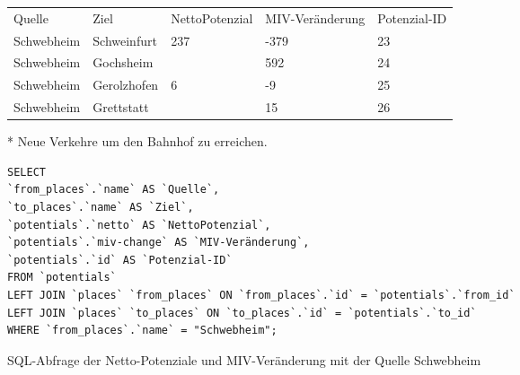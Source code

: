 \begin{tabular}{ l  l  l  l  l }
Quelle & Ziel & NettoPotenzial & MIV-Veränderung & Potenzial-ID\\ 
Schwebheim & Schweinfurt & 237 & -379 & 23\\ 
Schwebheim & Gochsheim &  & 592 & 24\\ 
Schwebheim & Gerolzhofen & 6 & -9 & 25\\ 
Schwebheim & Grettstatt &  & 15 & 26\\ 
\end{tabular}     
\newline
\newline
* Neue Verkehre um den Bahnhof zu erreichen.
\newline
\begin{listing}[htbp]
\begin{verbatim}
SELECT
`from_places`.`name` AS `Quelle`, 
`to_places`.`name` AS `Ziel`, 
`potentials`.`netto` AS `NettoPotenzial`, 
`potentials`.`miv-change` AS `MIV-Veränderung`, 
`potentials`.`id` AS `Potenzial-ID`
FROM `potentials`
LEFT JOIN `places` `from_places` ON `from_places`.`id` = `potentials`.`from_id`
LEFT JOIN `places` `to_places` ON `to_places`.`id` = `potentials`.`to_id`
WHERE `from_places`.`name` = "Schwebheim";
\end{verbatim}
\caption{SQL-Abfrage der Netto-Potenziale und MIV-Veränderung mit der Quelle Schwebheim}\label{lst-fz-schwebheim}
\end{listing}